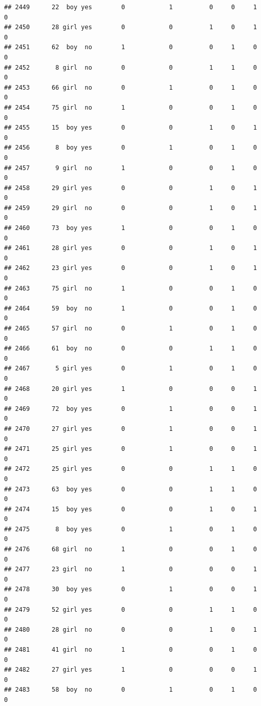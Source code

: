 \documentclass[man]{apa6}
\begin{document}
\begin{verbatim}
## 2449      22  boy yes        0            1          0     0     1     0
## 2450      28 girl yes        0            0          1     0     1     0
## 2451      62  boy  no        1            0          0     1     0     0
## 2452       8 girl  no        0            0          1     1     0     0
## 2453      66 girl  no        0            1          0     1     0     0
## 2454      75 girl  no        1            0          0     1     0     0
## 2455      15  boy yes        0            0          1     0     1     0
## 2456       8  boy yes        0            1          0     1     0     0
## 2457       9 girl  no        1            0          0     1     0     0
## 2458      29 girl yes        0            0          1     0     1     0
## 2459      29 girl  no        0            0          1     0     1     0
## 2460      73  boy yes        1            0          0     1     0     0
## 2461      28 girl yes        0            0          1     0     1     0
## 2462      23 girl yes        0            0          1     0     1     0
## 2463      75 girl  no        1            0          0     1     0     0
## 2464      59  boy  no        1            0          0     1     0     0
## 2465      57 girl  no        0            1          0     1     0     0
## 2466      61  boy  no        0            0          1     1     0     0
## 2467       5 girl yes        0            1          0     1     0     0
## 2468      20 girl yes        1            0          0     0     1     0
## 2469      72  boy yes        0            1          0     0     1     0
## 2470      27 girl yes        0            1          0     0     1     0
## 2471      25 girl yes        0            1          0     0     1     0
## 2472      25 girl yes        0            0          1     1     0     0
## 2473      63  boy yes        0            0          1     1     0     0
## 2474      15  boy yes        0            0          1     0     1     0
## 2475       8  boy yes        0            1          0     1     0     0
## 2476      68 girl  no        1            0          0     1     0     0
## 2477      23 girl  no        1            0          0     0     1     0
## 2478      30  boy yes        0            1          0     0     1     0
## 2479      52 girl yes        0            0          1     1     0     0
## 2480      28 girl  no        0            0          1     0     1     0
## 2481      41 girl  no        1            0          0     1     0     0
## 2482      27 girl yes        1            0          0     0     1     0
## 2483      58  boy  no        0            1          0     1     0     0

\end{verbatim}
\end{document}
